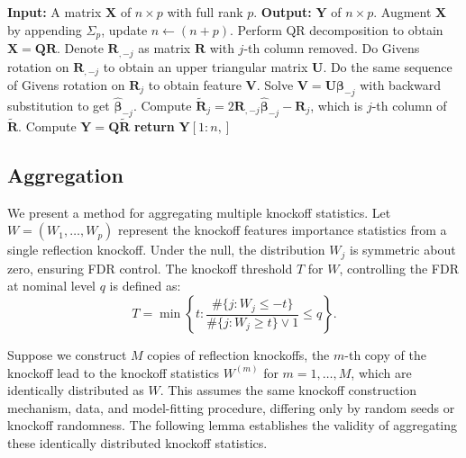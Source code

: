 \documentclass[12pt,Times]{article}
\def\V{{\mathcal{V}}}
\def\X{{\mathbf{X}}}
\def\Y{{\mathbf{Y}}}
\def\mbeta{{\mathbf{\beta}}}
\def\Q{{\mathbf{Q}}}
\def\R{{\mathbf{R}}}
\def\U{{\mathbf{U}}}
\def\V{{\mathbf{V}}}
\begin{document}
\vspace{-0.2in}
 {\centering
\begin{minipage}[t]{\linewidth}
\begin{algorithm}[H]
\caption{QR decomposition for Householder reflection}
\label{alg:aug}
\begin{algorithmic}[1]
    \STATE \textbf{Input:} A matrix $\X$ of $n \times p$ with full rank $p$.  
    \STATE \textbf{Output:} ${\Y}$ of $n \times p$. 
    \STATE Augment $\X$ by appending $\Sigma_p$, update $n\leftarrow (n+p)$.
    \STATE Perform QR decomposition to obtain $\X=\Q\R$.  
    \FOR {each column $\R_j$ of $\R$}
        \STATE Denote $\R_{,-j}$ as matrix $\R$ with $j$-th column removed.
        \STATE Do Givens rotation on $\R_{,-j}$ to obtain an upper triangular matrix $\U$. 
        \STATE Do the same sequence of Givens rotation on $\R_j$ to obtain feature $\V$.
        \STATE Solve $\V=\U\mbeta_{-j}$ with backward substitution to get $\hat\mbeta_{-j}$. 
         \STATE Compute $\tilde{\R}_j = 2 \R_{,-j} \hat\mbeta_{-j}  - \R_j$, which is $j$-th column of $\tilde{\R}$.  
    \ENDFOR
    \STATE Compute $\Y = \Q \tilde{\R}$ 
\STATE \textbf{return} $\Y[1:n,]$
\end{algorithmic}
\end{algorithm}
\end{minipage}
\vspace{0.2in}
}





\subsection{Aggregation}
We present a method for aggregating multiple knockoff statistics. Let $W=(W_1, \dots, W_p)$ represent the knockoff features importance statistics from a single reflection knockoff. Under the null, the distribution $W_j$ is symmetric about zero, ensuring FDR control. 
The knockoff threshold $T$ for $W$, controlling the FDR at nominal level $q$ is defined as:  
\begin{equation}\label{knockoff.threshold}
T=\min\left\{t: \frac{\#\{j: W_j \le -t\}}{\#\{j: W_j \ge t\}  \vee 1} \le q \right\}.
\end{equation}

Suppose we construct $M$ copies of reflection knockoffs, the $m$-th copy of the knockoff lead to the knockoff statistics $W^{(m)}$ for $m=1, \dots, M$, which are identically distributed as $W$. This assumes the same knockoff construction mechanism, data, and model-fitting procedure, differing only by random seeds or knockoff randomness. The following lemma establishes the validity of aggregating these identically distributed knockoff statistics. 
\end{document}
